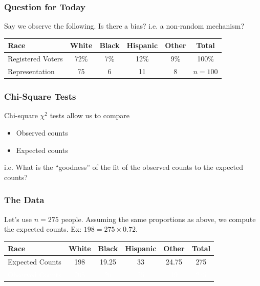 \documentclass[handout]{beamer}
\newcommand{\blue}[1]{\textcolor{blue2}{#1}}
\newcommand{\white}[1]{\textcolor{white}{#1}}
\begin{document}
\begin{frame}[fragile]
\frametitle{Question for Today}

Say we observe the following.  Is there a bias?  i.e. a non-random mechanism?

\begin{center}
\begin{tabular}{l||cccc|c}
Race & White & Black & Hispanic & Other & Total \\ 
\hline
Registered Voters & 72\% & 7\% & 12\% & 9\% & 100\%\\ 
Representation & 75 & 6 & 11 & 8 & $n=100$ \\ 
\end{tabular}
\end{center}

\end{frame}


\begin{frame}[fragile]
\frametitle{Chi-Square Tests}

\blue{Chi-square $\chi^2$ tests} allow us to compare
\begin{itemize}
\item Observed counts
\item Expected counts
\end{itemize}

\vspace{0.5cm}

\pause i.e. What is the \blue{``goodness''} of the fit of the observed counts to the expected counts?

\end{frame}


\begin{frame}[fragile]
\frametitle{The Data}

Let's use $n=275$ people.  Assuming the same proportions as above,  we compute the \blue{expected} counts.  Ex: $198 = 275 \times 0.72$. 

\begin{center}
\begin{tabular}{l||cccc|c}
Race & White & Black & Hispanic & Other & Total \\ 
\hline
Expected Counts & 198 & 19.25 & 33 & 24.75 & 275\\ 
\white{Observed Counts} & \white{205} & \white{26} & \white{25} & \white{19} & \white{275}\\ 
\end{tabular}
\end{center}

\end{frame}
\end{document}
